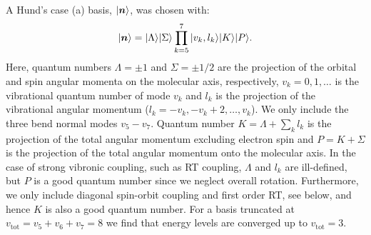 A Hund's case (a) basis, $| \bm n \rangle$, was chosen with: 
\begin{equation}
    | \bm n \rangle = |\Lambda \rangle |\Sigma \rangle \prod_{k=5}^7 |v_k, l_k \rangle |K \rangle |P \rangle.
    \label{eqn:Basis}
\end{equation}
Here, quantum numbers $\Lambda=\pm 1$ and $\Sigma=\pm 1/2$ are the projection of the orbital and spin angular momenta on the molecular axis, respectively, $v_k=0, 1, \dots$ is the vibrational quantum number of mode $v_k$ and $l_k$ is the projection of the vibrational angular momentum ($l_k=-v_k,-v_k+2,\ldots,v_k$).
We only include the three bend normal modes $v_5-v_7$.
Quantum number $K=\Lambda+\sum_k l_k$ is the projection of the total angular momentum excluding electron spin and $P=K+\Sigma$ is the projection of the total angular momentum onto the molecular axis.
In the case of strong vibronic coupling, such as RT coupling, $\Lambda$ and $l_k$ are ill-defined, but $P$ is a good quantum number since we neglect overall rotation. Furthermore, we only include diagonal spin-orbit coupling and first order RT, see below, and hence $K$ is also a good quantum number.
For a basis truncated at $v_\mathrm{tot}=v_5+v_6+v_7=8$ we find that energy levels are converged up to $v_\mathrm{tot}=3$.

